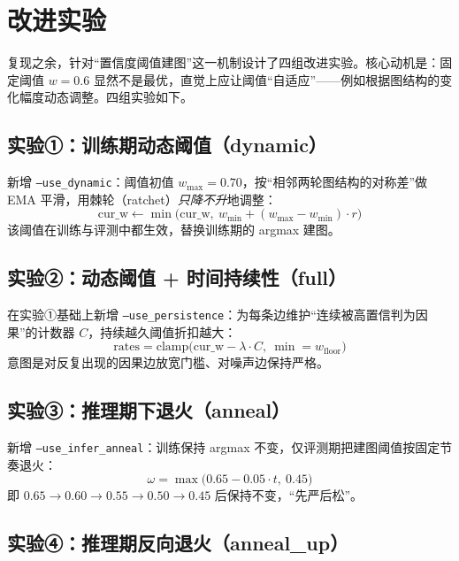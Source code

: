 \documentclass[11pt,a4paper]{ctexart}
\begin{document}
\section{改进实验}

复现之余，针对``置信度阈值建图''这一机制设计了四组改进实验。核心动机是：固定阈值 $w=0.6$ 显然不是最优，直觉上应让阈值``自适应''——例如根据图结构的变化幅度动态调整。四组实验如下。

\subsection{实验①：训练期动态阈值（dynamic）}

新增 \texttt{--use\_dynamic}：阈值初值 $w_{\max}=0.70$，按``相邻两轮图结构的对称差''做 EMA 平滑，用棘轮（ratchet）\emph{只降不升}地调整：
\begin{equation}
\mathrm{cur\_w} \leftarrow \min\!\big(\mathrm{cur\_w},\ w_{\min}+(w_{\max}-w_{\min})\cdot r\big)
\end{equation}
该阈值在训练与评测中都生效，替换训练期的 argmax 建图。

\subsection{实验②：动态阈值 + 时间持续性（full）}

在实验①基础上新增 \texttt{--use\_persistence}：为每条边维护``连续被高置信判为因果''的计数器 $C$，持续越久阈值折扣越大：
\begin{equation}
\mathrm{rates} = \mathrm{clamp}\!\big(\mathrm{cur\_w} - \lambda\cdot C,\ \min=w_{\mathrm{floor}}\big)
\end{equation}
意图是对反复出现的因果边放宽门槛、对噪声边保持严格。

\subsection{实验③：推理期下退火（anneal）}

新增 \texttt{--use\_infer\_anneal}：训练保持 argmax 不变，仅评测期把建图阈值按固定节奏退火：
\begin{equation}
\omega = \max\!\big(0.65 - 0.05\cdot t,\ 0.45\big)
\end{equation}
即 $0.65\to0.60\to0.55\to0.50\to0.45$ 后保持不变，``先严后松''。

\subsection{实验④：推理期反向退火（anneal\_up）}
\end{document}
